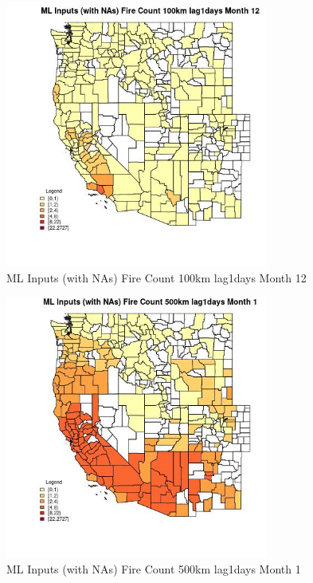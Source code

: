 \begin{figure} 
\centering  
\includegraphics[width=0.77\textwidth]{Code_Outputs/Report_ML_input_PM25_Step4_part_f_de_duplicated_aveswNAs_CountyFire_Count_100km_lag1daysmedianMonth12.jpg} 
\caption{\label{fig:Report_ML_input_PM25_Step4_part_f_de_duplicated_aveswNAsCountyFire_Count_100km_lag1daysmedianMonth12}ML Inputs (with NAs) Fire Count 100km lag1days Month 12} 
\end{figure} 
 

\begin{figure} 
\centering  
\includegraphics[width=0.77\textwidth]{Code_Outputs/Report_ML_input_PM25_Step4_part_f_de_duplicated_aveswNAs_CountyFire_Count_500km_lag1daysmedianMonth1.jpg} 
\caption{\label{fig:Report_ML_input_PM25_Step4_part_f_de_duplicated_aveswNAsCountyFire_Count_500km_lag1daysmedianMonth1}ML Inputs (with NAs) Fire Count 500km lag1days Month 1} 
\end{figure} 
 

